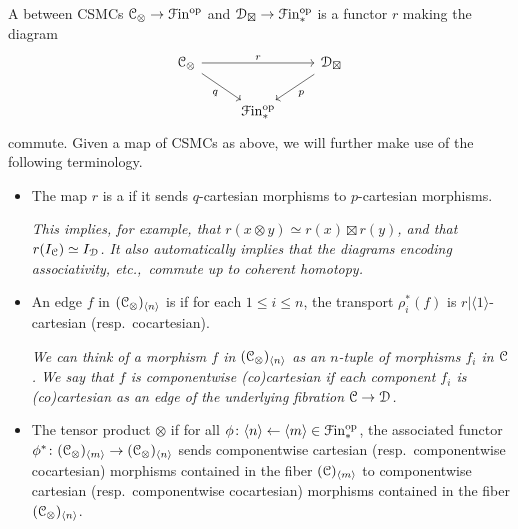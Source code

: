 \documentclass[main.tex]{subfiles}
\begin{document}
\begin{definition}
  A  between CSMCs $\mathcal{C}_{\otimes} \to \mathcal{F}\mathrm{in}^{\mathrm{op}}$ and $\mathcal{D}_{\boxtimes} \to \mathcal{F}\mathrm{in}_{*}^{\mathrm{op}}$ is a functor $r$ making the diagram
  \begin{equation*}
    \begin{tikzcd}
      \category{C}_{\otimes}
      \arrow[rr, "r"]
      \arrow[dr, swap, "q"]
      && \category{D}_{\boxtimes}
      \arrow[dl, "p"]
      \\
      & \Finp\op
    \end{tikzcd}
  \end{equation*}
  commute. Given a map of CSMCs as above, we will further make use of the following terminology.
  \begin{itemize}
    \item The map $r$ is a  if it sends $q$-cartesian morphisms to $p$-cartesian morphisms.

      \textit{This implies, for example, that $r(x \otimes y) \simeq r(x) \boxtimes r(y)$, and that $r(I_{\mathcal{C}}) \simeq I_{\mathcal{D}}$. It also automatically implies that the diagrams encoding associativity, etc.,\ commute up to coherent homotopy.}

    \item An edge $f$ in $(\mathcal{C}_{\otimes})_{\langle n \rangle}$ is  if for each $1 \leq i \leq n$, the transport $\rho_{i}^{*}(f)$ is $r|\langle 1 \rangle$-cartesian (resp.\ cocartesian).

      \textit{We can think of a morphism $f$ in $(\mathcal{C}_{\otimes})_{\langle n \rangle}$ as an $n$-tuple of morphisms $f_{i}$ in $\mathcal{C}$. We say that $f$ is componentwise (co)cartesian if each component $f_{i}$ is (co)cartesian as an edge of the underlying fibration $\mathcal{C} \to \mathcal{D}$.}

    \item The tensor product $\otimes$  if for all $\phi\colon \langle n \rangle \leftarrow \langle m \rangle \in \mathcal{F}\mathrm{in}_{*}^{\mathrm{op}}$, the associated functor $\phi^{*}\colon (\mathcal{C}_{\otimes})_{\langle m \rangle} \to (\mathcal{C}_{\otimes})_{\langle n \rangle}$ sends componentwise cartesian (resp.\ componentwise cocartesian) morphisms contained in the fiber $(\mathcal{C})_{\langle m \rangle}$ to componentwise cartesian (resp.\ componentwise cocartesian) morphisms contained in the fiber $(\mathcal{C}_{\otimes})_{\langle n \rangle}$.


\end{itemize}
\end{definition}
\end{document}
